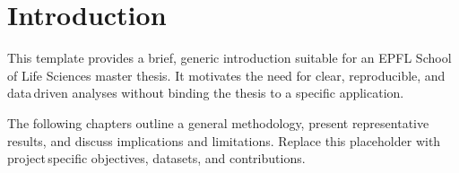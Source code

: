 \section{Introduction}

\noindent This template provides a brief, generic introduction suitable for an EPFL School of Life Sciences master thesis. It motivates the need for clear, reproducible, and data\,driven analyses without binding the thesis to a specific application.

\noindent The following chapters outline a general methodology, present representative results, and discuss implications and limitations. Replace this placeholder with project\,specific objectives, datasets, and contributions.
